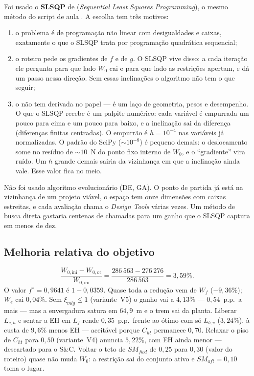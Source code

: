 Foi usado o \textbf{SLSQP} de 
(\emph{Sequential Least Squares Programming}), o mesmo método do script
de aula . A escolha tem três motivos:

\begin{enumerate}
\item o problema é de programação não linear com desigualdades e
      caixas, exatamente o que o SLSQP trata por programação
      quadrática sequencial;
\item o roteiro pede os gradientes de $f$ e de $g$. O SLSQP vive
      disso: a cada iteração ele pergunta para que lado $W_0$ cai e
      para que lado as restrições apertam, e dá um passo nessa direção.
      Sem essas inclinações o algoritmo não tem o que seguir;
\item o  não tem derivada no papel --- é um laço de
      geometria, pesos e desempenho. O que o SLSQP recebe é um palpite
      numérico: cada variável é empurrada um pouco para cima e um pouco
      para baixo, e a inclinação sai da diferença (diferenças finitas
      centradas). O empurrão é $h=10^{-4}$ nas variáveis já
      normalizadas. O padrão do SciPy ($\sim 10^{-8}$) é pequeno demais:
      o deslocamento some no resíduo de $\sim 10$~N do ponto fixo
      interno de $W_0$, e o ``gradiente'' vira ruído. Um $h$ grande
      demais sairia da vizinhança em que a inclinação ainda vale. Esse
      valor fica no meio.
\end{enumerate}

Não foi usado algoritmo evolucionário (DE, GA). O ponto de partida já
está na vizinhança de um projeto viável, o espaço tem onze
dimensões com caixas estreitas, e cada avaliação chama o
\emph{Design Tools} várias vezes. Um método de busca direta gastaria
centenas de chamadas para um ganho que o SLSQP captura em menos de dez.

\subsection{Melhoria relativa do objetivo}
\label{sec:p3q5}

\begin{equation}
\frac{W_{0,\mathrm{ini}}-W_{0,\mathrm{ot}}}{W_{0,\mathrm{ini}}}
= \frac{286\,563-276\,276}{286\,563}
= 3{,}59\%.
\end{equation}
O valor $f^\star=0{,}9641$ é $1-0{,}0359$. Quase toda a redução vem
de $W_f$ ($-9{,}36\%$); $W_e$ cai $0{,}04\%$. Sem $\xi_{mlg}\le 1$
(variante~V5) o ganho vai a $4{,}13\%$ --- $0{,}54$~p.p.\ a mais --- mas a
envergadura satura em $64{,}9$~m e o trem sai da planta. Liberar
$L_{c,h}$ e sentar a EH em $L_f$ rende $0{,}35$~p.p.\ frente ao ótimo
com só $L_{b,v}$ ($3{,}24\%$), à custa de $9{,}6\%$ menos EH --- aceitável
porque $C_{ht}$ permanece $0{,}70$. Relaxar o piso de $C_{ht}$ para
$0{,}50$ (variante~V4) anuncia $5{,}22\%$, com EH ainda menor ---
descartado para o S\&C. Voltar o teto de $SM_{fwd}$ de $0{,}25$ para
$0{,}30$ (valor do roteiro) quase não muda $W_0$: a restrição sai do
conjunto ativo e $SM_{aft}=0{,}10$ toma o lugar.

